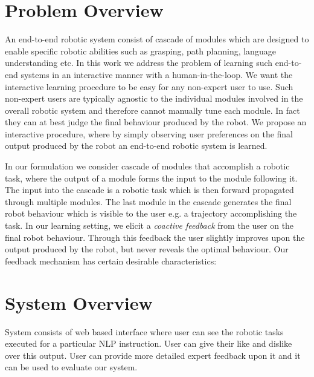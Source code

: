\section{Problem Overview}

An end-to-end robotic system consist of cascade of modules which are designed to enable specific robotic abilities such as grasping, path planning, language understanding etc. In this
work we address the problem of learning such end-to-end systems in an interactive manner with a human-in-the-loop. We want the interactive learning procedure to be easy for any non-expert user to use. Such non-expert users are typically agnostic to the individual modules involved in the overall robotic system and therefore cannot manually tune each module. In fact they can at best judge the final behaviour produced by the robot. We propose an interactive procedure, where by simply observing user preferences on the final output produced by the robot an end-to-end robotic system is learned.

In our formulation we consider cascade of modules that accomplish a robotic task, where the output of a module forms the input to the module following it. The input into the cascade is a robotic task which is then forward propagated through multiple modules. The last module in the cascade generates the final robot behaviour which is visible to the user e.g. a trajectory accomplishing the task. In our learning setting, we elicit a \textit{coactive feedback} from the user on the final robot behaviour. Through this feedback the user slightly improves upon the output produced by the robot, but never reveals the optimal behaviour. Our feedback mechanism has certain desirable characteristics:  
\section{System Overview}



System consists of web based interface where user can see the robotic tasks
executed for a particular NLP instruction. User can give their like and dislike
over this output. User can provide more detailed expert feedback upon it and it
can be used to evaluate our system. 


